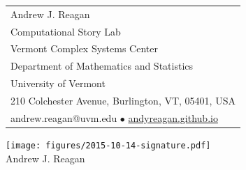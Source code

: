 \documentclass[11pt]{article}
\begin{document}
\sffamily 


{ \small
\begin{tabular}[b]{l}
Andrew J. Reagan\\
Computational Story Lab\\
Vermont Complex Systems Center\\
Department of Mathematics and Statistics\\
University of Vermont\\
210 Colchester Avenue, Burlington, VT, 05401, USA\\
andrew.reagan@uvm.edu
$\bullet$
\url{andyreagan.github.io}
\end{tabular}
}


\bigskip
\bigskip



\texttt{[image: figures/2015-10-14-signature.pdf]}\\
Andrew J. Reagan



\end{document}
